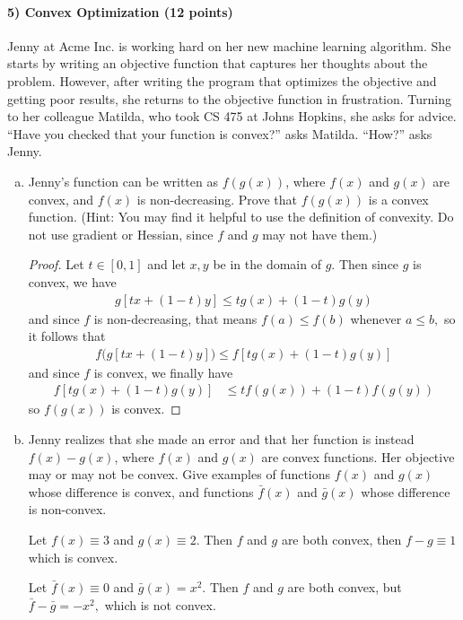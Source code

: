 \documentclass{article}
\begin{document}
\newpage
\paragraph{5) Convex Optimization (12 points)}
Jenny at Acme Inc. is working hard on her new machine learning algorithm. She starts by writing an objective function
that captures her thoughts about the problem. However, after writing the program that optimizes the objective
and getting poor results, she returns to the objective function in frustration. Turning to her colleague Matilda,
who took CS 475 at Johns Hopkins, she asks for advice. ``Have you checked that your function is convex?'' asks Matilda.
``How?'' asks Jenny.
\begin{enumerate}[(a)]
	\item Jenny's function can be written as $f(g(x))$, where $f(x)$ and $g(x)$ are convex, and $f(x)$ is non-decreasing. Prove that $f(g(x))$ is a convex function. (Hint: You may find it helpful to use the definition of convexity. Do not use gradient or Hessian, since $f$ and $g$ may not have them.)
		\begin{proof}
			Let $t\in [0, 1]$ and let $x, y$ be in the domain of $g.$ Then since $g$ is convex, we have
			\begin{align*}
				g\left[ tx + (1-t)y \right] \le tg(x) + (1-t)g(y)
			\end{align*}
			and since $f$ is non-decreasing, that means $f(a)\le f(b)$ whenever $a\le b,$ so it follows that
			\begin{align*}
				f\big(g\left[ tx+(1-t)y \right]\big) \le f\left[ tg(x) + (1-t)g(y) \right]
			\end{align*}
			and since $f$ is convex, we finally have
			\begin{align*}
				f\left[ tg(x) + (1-t)g(y) \right] &\le t f(g(x)) + (1-t)f(g(y))
			\end{align*}
			so $f(g(x))$ is convex.
		\end{proof}
		
	\item Jenny realizes that she made an error and that her function is instead
		$f(x)-g(x)$, where $f(x)$ and $g(x)$ are convex functions. Her objective may or may not be convex. Give examples of functions $f(x)$ and $g(x)$ whose difference is convex, and functions $\bar{f}(x)$ and $\bar{g}(x)$ whose difference is non-convex.
		\begin{soln}
			Let $f(x)\equiv 3$ and $g(x)\equiv 2.$ Then $f$ and $g$ are both convex, then $f-g \equiv 1$ which is convex.

			Let $\bar f(x)\equiv0$ and $\bar g(x)=x^2.$ Then $f$ and $g$ are both convex, but $\bar f-\bar g=-x^2,$ which is not convex.		
		\end{soln}
\end{enumerate}
\end{document}

